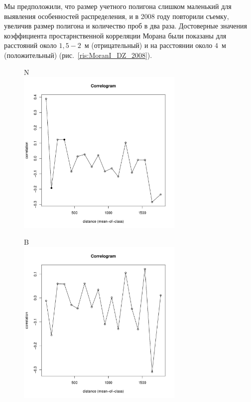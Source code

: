Мы предположили, что размер учетного полигона слишком маленький для выявления особенностей распределения, и в 2008 году повторили съемку, увеличив размер полигона и количество проб в два раза.
Достоверные значения коэффициента простарнственной корреляции Морана были показаны для расстояний около $1,5-2$~м (отрицательный) и на расстоянии около $4$~м (положительный) (рис.~\ref{ris:MoranI_DZ_2008}).
%
	\begin{figure}[h]

	\begin{minipage}[b]{.46\linewidth}
	\begin{center}
	{\small N}\\
		\includegraphics[width=80mm]{../Barenc_Sea/distribution_Moran/Plyazh0812_moran_N_Macoma_balthica_.pdf}
	\end{center}
	\end{minipage}
%
	\hfil %
%
	\begin{minipage}[b]{.46\linewidth}
	\begin{center}
	{\small B}\\
		\includegraphics[width=80mm]{../Barenc_Sea/distribution_Moran/Plyazh0812_moran_B_Macoma_balthica_.pdf}
	\end{center}
	\end{minipage}
	

\end{figure}
